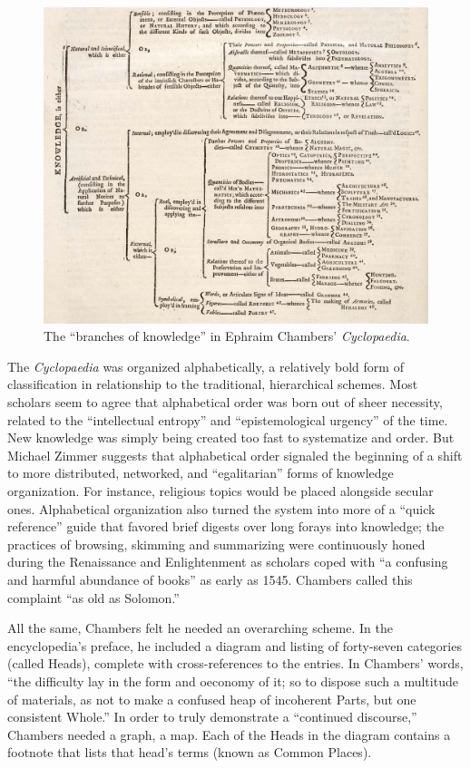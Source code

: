 \begin{figure}[ht]
\centering
\includegraphics[width=400pt]{figures/cyclopaedia-tree}
\caption{The ``branches of knowledge'' in Ephraim Chambers' \emph{Cyclopaedia}.}
\label{fig:cyclopaedia-tree}
\end{figure}

The \emph{Cyclopaedia} was organized alphabetically, a relatively bold form of classification in relationship to the traditional, hierarchical schemes. Most scholars seem to agree that alphabetical order was born out of sheer necessity, related to the ``intellectual entropy'' and ``epistemological urgency'' of the time.\autocite[5]{rosenberg_early_2003} New knowledge was simply being created too fast to systematize and order. But Michael Zimmer suggests that alphabetical order signaled the beginning of a shift to more distributed, networked, and ``egalitarian'' forms of knowledge organization.\autocite[100]{zimmer_renvois_2009} For instance, religious topics would be placed alongside secular ones. Alphabetical organization also turned the system into more of a ``quick reference'' guide that favored brief digests over long forays into knowledge; the practices of browsing, skimming and summarizing were continuously honed during the Renaissance and Enlightenment as scholars coped with ``a confusing and harmful abundance of books'' as early as 1545.\autocite{blair_reading_2003} Chambers called this complaint ``as old as Solomon.''\autocite[65]{yeo_solution_2003}

All the same, Chambers felt he needed an overarching scheme. In the encyclopedia's preface, he included a diagram and listing of forty-seven categories (called Heads), complete with cross-references to the entries. In Chambers' words, ``the difficulty lay in the form and oeconomy of it; so to dispose such a multitude of materials, as not to make a confused heap of incoherent Parts, but one consistent Whole.''\autocite[67]{yeo_solution_2003} In order to truly demonstrate a ``continued discourse,'' Chambers needed a graph, a map. Each of the Heads in the diagram contains a footnote that lists that head's terms (known as Common Places).

